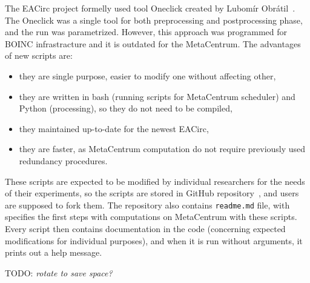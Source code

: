 \documentclass[
  print, %
  Table,   %
  nolof,     %
  nolot,     %
  11pt, %
  oneside  %
]{fithesis3}
\newcommand{\todo}[1]{TODO: \textit{#1}}
\begin{document}
The EACirc project formelly used tool Oneclick created by Lubomír Obrátil~\cite{obratilBcThesis}. The Oneclick was a single tool for both preprocessing and postprocessing phase, and the run was parametrized. However, this approach was programmed for BOINC infrastracture and it is outdated for the MetaCentrum. The advantages of new scripts are: 

\begin{itemize}
    \item they are single purpose, easier to modify one without affecting other,
    \item they are written in bash (running scripts for MetaCentrum scheduler) and Python (processing), so they do not need to be compiled,
    \item they maintained up-to-date for the newest EACirc,
    \item they are faster, as MetaCentrum computation do not require previously used redundancy procedures.
\end{itemize}

These scripts are expected to be modified by individual researchers for the needs of their experiments, so the scripts are stored in GitHub repository~\cite{eaUtils}, and users are supposed to fork them. The repository also contains \texttt{readme.md} file, with specifies the first steps with computations on MetaCentrum with these scripts. Every script then contains documentation in the code (concerning expected modifications for individual purposes), and when it is run without arguments, it prints out a help message.

\todo{rotate to save space?}
\end{document}
